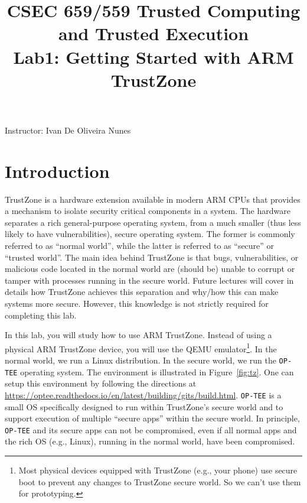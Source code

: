 \documentclass[10pt]{article}
\begin{document}
\title{CSEC 659/559 Trusted Computing and Trusted Execution\\Lab1: Getting Started with ARM TrustZone}
\date{}
\maketitle

\centerline{Instructor: Ivan De Oliveira Nunes}

\section{Introduction}

TrustZone is a hardware extension available in modern ARM CPUs that provides a mechanism to isolate security critical components in a system. The hardware separates a rich general-purpose operating system, from a much smaller (thus less likely to have vulnerabilities), secure operating system. The former is commonly referred to as ``normal world'', while the latter is referred to as ``secure'' or ``trusted world''. The main idea behind TrustZone is that bugs, vulnerabilities, or malicious code located in the normal world are (should be) unable to corrupt or tamper with processes running in the secure world. Future lectures will cover in details how TrustZone achieves this separation and why/how this can make systems more secure. However, this knowledge is not strictly required for completing this lab.

In this lab, you will study how to use ARM TrustZone. Instead of using a physical ARM TrustZone device, you will use the QEMU emulator\footnote{Most physical devices equipped with TrustZone (e.g., your phone) use secure boot to prevent any changes to TrustZone secure world. So we can't use them for prototyping.}.
In the normal world, we run a Linux distribution. 
In the secure world, we run the \verb|OP-TEE| operating system. 
The environment is illustrated in Figure~\ref{fig:tz}. One can setup this environment by following the directions at \url{https://optee.readthedocs.io/en/latest/building/gits/build.html}.
\verb|OP-TEE| is a small OS specifically designed to run within TrustZone's secure world and to support execution of multiple ``secure apps'' within the secure world. In principle, \verb|OP-TEE| and its secure apps can not be compromised, even if all normal apps and the rich OS (e.g., Linux), running in the normal world, have been compromised.
\end{document}
